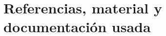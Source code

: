 \documentclass[12pt, spanish]{article}
\begin{document}

\tableofcontents
\pagebreak



\newpage

\newpage

\newpage

\newpage

\newpage



\newpage

\section{Referencias, material y documentación usada}
\end{document}
